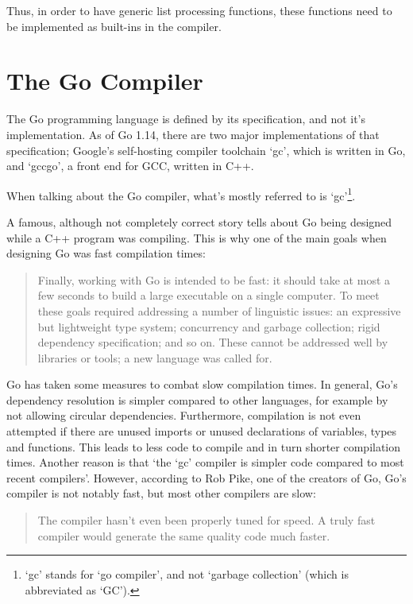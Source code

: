 Thus, in order to have generic list processing functions, these functions need to
be implemented as built-ins in the compiler.

\section{The Go Compiler}

The Go programming language is defined by its specification\autocite{go-spec}, and not
it's implementation. As of Go 1.14, there are two major implementations of that
specification; Google's self-hosting compiler toolchain `gc', which is written in
Go, and `gccgo', a front end for GCC, written in C++.

When talking about the Go compiler, what's mostly referred to is `gc'\footnote{`gc' stands
for `go compiler', and not `garbage collection' (which is abbreviated as `GC').}.

A famous, although not completely correct story tells about Go being designed
while a C++ program was compiling\autocite{less-is-more}.
This is why one of the main goals when designing Go was fast compilation times:
\begin{quote}
    Finally, working with Go is intended to be fast: it should take at most a few
    seconds to build a large executable on a single computer. To meet these goals
    required addressing a number of linguistic issues: an expressive but lightweight
    type system; concurrency and garbage collection; rigid dependency specification;
    and so on. These cannot be addressed well by libraries or tools; a new language
    was called for.\autocite{go-faq}
\end{quote}

Go has taken some measures to combat slow compilation times. In general, Go's dependency resolution is simpler
compared to other languages, for example by not allowing circular dependencies.
Furthermore, compilation is not even attempted if there are unused
imports or unused declarations of variables, types and functions.
This leads to less code to compile and in turn shorter compilation times.
Another reason is that `the `gc' compiler is simpler code compared to most
recent compilers'\autocite{nuts-compiler}. However, according
to Rob Pike, one of the creators of Go, Go's compiler is not notably fast, but
most other compilers are slow:

\begin{quote}
    The compiler hasn't even been properly tuned for speed. A truly fast compiler
    would generate the same quality code much faster.\autocite{nuts-compiler}
\end{quote}

